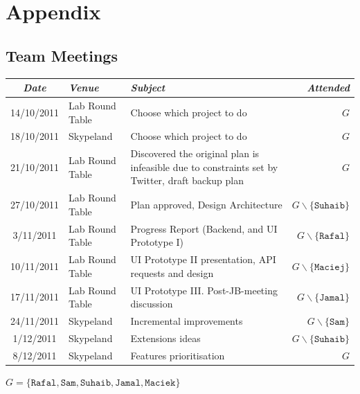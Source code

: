 \documentclass{report}
\begin{document}
	\chapter{Appendix}
	
	\section{Team Meetings}
	\begin{tabular}{c | l p{7cm} r}
    \emph{\large Date} &  \emph{\large Venue} &  \emph{\large Subject} &  \emph{\large Attended}\\
    \hline
    14/10/2011 & Lab Round Table & Choose which project to do & \(G\)\\
    18/10/2011 & Skypeland & Choose which project to do & \(G\)\\
    21/10/2011 & Lab Round Table & Discovered the original plan is infeasible due to constraints set by Twitter, draft backup plan & \(G\)\\
    27/10/2011 & Lab Round Table & Plan approved, Design Architecture & \(G \smallsetminus \{\texttt{Suhaib}\}\)\\
    3/11/2011 & Lab Round Table & Progress Report (Backend, and UI Prototype I) & \(G \smallsetminus \{\texttt{Rafal}\}\)\\
    10/11/2011 & Lab Round Table & UI Prototype II presentation, API requests and design & \(G \smallsetminus \{\texttt{Maciej}\}\)\\
    17/11/2011 & Lab Round Table & UI Prototype III. Post-JB-meeting discussion & \(G \smallsetminus \{\texttt{Jamal}\}\)\\
    24/11/2011 & Skypeland & Incremental improvements & \(G \smallsetminus \{\texttt{Sam}\}\)\\
    1/12/2011 & Skypeland & Extensions ideas & \(G \smallsetminus \{\texttt{Suhaib}\}\)\\
    8/12/2011 & Skypeland & Features prioritisation & \(G\)\\
  \end{tabular}

  \(G=\{\texttt{Rafal}, \texttt{Sam}, \texttt{Suhaib}, \texttt{Jamal}, \texttt{Maciek}\}\)\\


	
\end{document}
